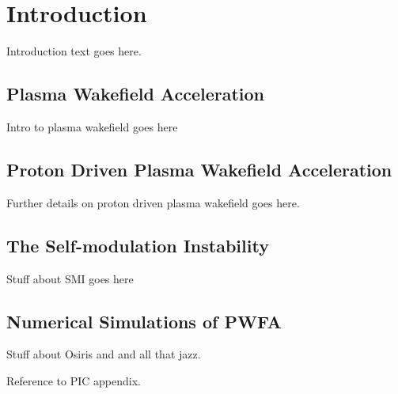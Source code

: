 %
%

\chapter{Introduction}
\label{Ch:Intro}

Introduction text goes here.

\section{Plasma Wakefield Acceleration}
\label{Int:PWFA}

Intro to plasma wakefield goes here

\section{Proton Driven Plasma Wakefield Acceleration}
\label{Int:PDPWFA}

Further details on proton driven plasma wakefield goes here.

\section{The Self-modulation Instability}
\label{Int:SMI}

Stuff about SMI goes here

\section{Numerical Simulations of PWFA}
\label{Int:Sim}

Stuff about Osiris and and all that jazz.

Reference to PIC appendix.


